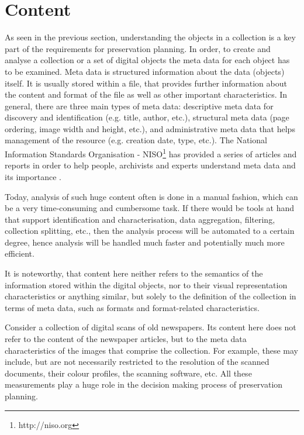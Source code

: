 \section{Content}
As seen in the previous section, understanding the objects in a collection is a key part of the requirements for preservation planning. In order, to create and analyse a collection or a set of digital objects the meta data for each object has to be examined. Meta data is structured information about the data (objects) itself. It is usually stored within a file, that provides further information about the content and format of the file as well as other important characteristics. In general, there are three main types of meta data: descriptive meta data for discovery and identification (e.g. title, author, etc.), structural meta data (page ordering, image width and height, etc.), and administrative meta data that helps management of the resource (e.g. creation date, type, etc.). The National Information Standards Organisation - NISO\footnote{http://niso.org} has provided a series of articles and reports in order to help people, archivists and experts understand meta data and its importance \cite{citeulike:6387279}.

Today, analysis of such huge content often is done in a manual fashion, which can be a very time-consuming and cumbersome task. If there would be tools at hand that support identification and characterisation, data aggregation, filtering, collection splitting, etc., then the analysis process will be automated to a certain degree, hence analysis will be handled much faster and potentially much more efficient. 

It is noteworthy, that content here neither refers to the semantics of the information stored within the digital objects, nor to their visual representation characteristics or anything similar, but solely to the definition of the collection in terms of meta data, such as formats and format-related characteristics.

Consider a collection of digital scans of old newspapers. Its content here does not refer to the content of the newspaper articles, but to the meta data characteristics of the images that comprise the collection. For example, these may include, but are not necessarily restricted to the resolution of the scanned documents, their colour profiles, the scanning software, etc. All these measurements play a huge role in the decision making process of preservation planning.

